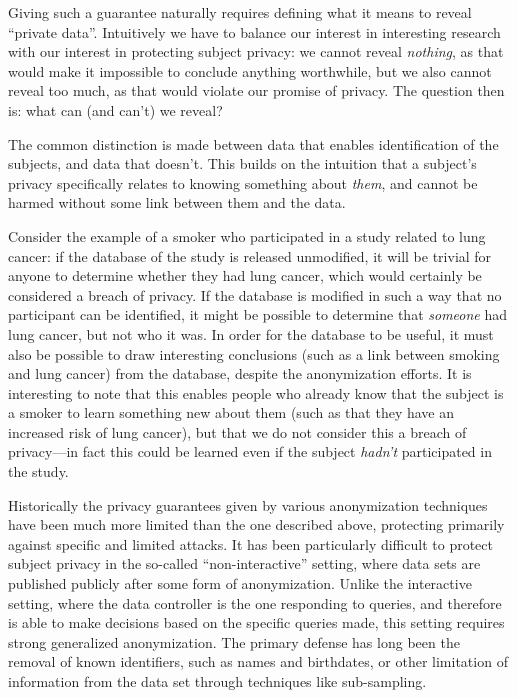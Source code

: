 \documentclass[12pt]{article}
\begin{document}
Giving such a guarantee naturally requires defining what it means to reveal ``private data''. Intuitively we have to balance our interest in interesting research with our interest in protecting subject privacy: we cannot reveal \emph{nothing}, as that would make it impossible to conclude anything worthwhile, but we also cannot reveal too much, as that would violate our promise of privacy. The question then is: what can (and can't) we reveal?

The common distinction is made between data that enables identification of the subjects, and data that doesn't. This builds on the intuition that a subject's privacy specifically relates to knowing something about \emph{them}, and cannot be harmed without some link between them and the data.

Consider the example of a smoker who participated in a study related to lung cancer: if the database of the study is released unmodified, it will be trivial for anyone to determine whether they had lung cancer, which would certainly be considered a breach of privacy. If the database is modified in such a way that no participant can be identified, it might be possible to determine that \emph{someone} had lung cancer, but not who it was. In order for the database to be useful, it must also be possible to draw interesting conclusions (such as a link between smoking and lung cancer) from the database, despite the anonymization efforts. It is interesting to note that this enables people who already know that the subject is a smoker to learn something new about them (such as that they have an increased risk of lung cancer), but that we do not consider this a breach of privacy---in fact this could be learned even if the subject \emph{hadn't} participated in the study. \bigskip

Historically the privacy guarantees given by various anonymization techniques have been much more limited than the one described above, protecting primarily against specific and limited attacks. It has been particularly difficult to protect subject privacy in the so-called ``non-interactive'' setting, where data sets are published publicly after some form of anonymization. Unlike the interactive setting, where the data controller is the one responding to queries, and therefore is able to make decisions based on the specific queries made, this setting requires strong generalized anonymization. The primary defense has long been the removal of known identifiers, such as names and birthdates, or other limitation of information from the data set through techniques like sub-sampling.
\end{document}
